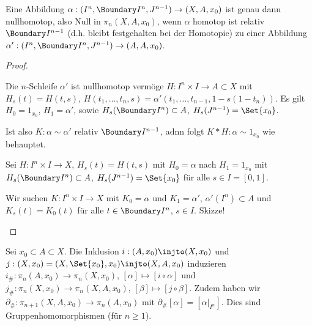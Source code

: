 \begin{lem}[Kompressionslemma]
    Eine Abbildung $\alpha: (I^n, \Boundary I^n, J^{n-1}) \to (X, A, x_0)$ ist genau dann nullhomotop, also Null in $\pi_n(X, A, x_0)$, wenn $\alpha$ homotop ist relativ $\Boundary I^{n-1}$ (d.h. bleibt festgehalten bei der Homotopie) zu einer Abbildung $\alpha': (I^n, \Boundary I^n, J^{n-1}) \to (A, A, x_0)$. 
    \begin{proof}
        \begin{seg}{\ProofImplication*}
            Die $n$-Schleife $\alpha'$ ist nullhomotop vermöge $H: I^n \times I \to A \subset X$ mit $H_s(t) = H(t,s)$,
            \begin{math}
                H(t_1, \dotsc, t_n, s) = \alpha'(t_1, \dotsc, t_{n-1}, 1 - s(1-t_n)).
            \end{math}
            Es gilt $H_0 = 1_{x_0}$, $H_1 = \alpha'$, sowie $H_s(\Boundary I^n) \subset A$, $H_s(J^{n-1}) = \Set{x_0}$.

            Ist also $K: \alpha \sim \alpha'$ relativ $\Boundary I^{n-1}$, adnn folgt $K \ast H: \alpha \sim 1_{x_0}$ wie behauptet.
        \end{seg}
        \begin{seg}{\ProofImplication}
            Sei $H: I^n \times I \to X$, $H_s(t) = H(t,s)$ mit $H_0 = \alpha$ nach $H_1 = 1_{x_0}$ mit $H_s(\Boundary I^n) \subset A$, $H_s(J^{n-1}) = \Set{x_0}$ für alle $s \in I = [0,1]$.

            Wir suchen $K: I^n \times I \to X$ mit $K_0 = \alpha$ und $K_1 = \alpha'$, $\alpha'(I^n) \subset A$ und $K_s(t) = K_0(t)$ für alle $t \in \Boundary I^n$, $s \in I$.
            Skizze!
        \end{seg}
    \end{proof}
\end{lem}


Sei $x_0 \subset A \subset X$.
Die Inklusion $i: (A, x_0) \injto (X, x_0)$ und $j: (X, x_0) = (X, \Set{x_0}, x_0) \injto (X, A, x_0)$ induzieren $i_\#: \pi_n(A,x_0) \to \pi_n(X,x_0)$, $[\alpha] \mapsto [i \circ \alpha]$ und $j_\#: \pi_n(X, x_0) \to \pi_n(X, A, x_0)$, $[\beta] \mapsto [j \circ \beta]$.
Zudem haben wir $\partial_\#: \pi_{n+1}(X, A, x_0) \to \pi_n(A, x_0)$ mit $\partial_\#[\alpha] = [\alpha|_{I^n}]$.
Dies sind Gruppenhomomorphismen (für $n \ge 1$).

